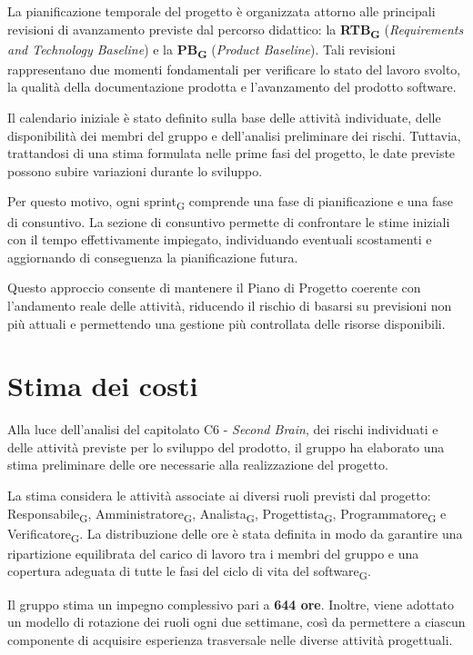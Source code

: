 \documentclass[a4paper, 10pt, colorlinks=true, linkcolor=black, urlcolor=blue, citecolor=blue, hidelinks]{article}
\begin{document}
La pianificazione temporale del progetto è organizzata attorno alle principali revisioni di avanzamento previste dal percorso didattico: la \textbf{RTB\textsubscript{G}} (\textit{Requirements and Technology Baseline}) e la \textbf{PB\textsubscript{G}} (\textit{Product Baseline}). Tali revisioni rappresentano due momenti fondamentali per verificare lo stato del lavoro svolto, la qualità della documentazione prodotta e l'avanzamento del prodotto software.

Il calendario iniziale è stato definito sulla base delle attività individuate, delle disponibilità dei membri del gruppo e dell'analisi preliminare dei rischi. Tuttavia, trattandosi di una stima formulata nelle prime fasi del progetto, le date previste possono subire variazioni durante lo sviluppo.

Per questo motivo, ogni sprint\textsubscript{G} comprende una fase di pianificazione e una fase di consuntivo. La sezione di consuntivo permette di confrontare le stime iniziali con il tempo effettivamente impiegato, individuando eventuali scostamenti e aggiornando di conseguenza la pianificazione futura.

Questo approccio consente di mantenere il Piano di Progetto coerente con l'andamento reale delle attività, riducendo il rischio di basarsi su previsioni non più attuali e permettendo una gestione più controllata delle risorse disponibili.

\section{Stima dei costi}

Alla luce dell'analisi del capitolato C6 - \textit{Second Brain}, dei rischi individuati e delle attività previste per lo sviluppo del prodotto, il gruppo ha elaborato una stima preliminare delle ore necessarie alla realizzazione del progetto.

La stima considera le attività associate ai diversi ruoli previsti dal progetto: Responsabile\textsubscript{G}, Amministratore\textsubscript{G}, Analista\textsubscript{G}, Progettista\textsubscript{G}, Programmatore\textsubscript{G} e Verificatore\textsubscript{G}. La distribuzione delle ore è stata definita in modo da garantire una ripartizione equilibrata del carico di lavoro tra i membri del gruppo e una copertura adeguata di tutte le fasi del ciclo di vita del software\textsubscript{G}.

Il gruppo stima un impegno complessivo pari a \textbf{644 ore}. Inoltre, viene adottato un modello di rotazione dei ruoli ogni due settimane, così da permettere a ciascun componente di acquisire esperienza trasversale nelle diverse attività progettuali.
\end{document}
